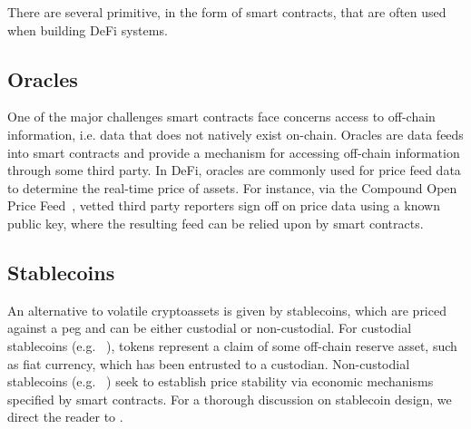 There are several primitive, in the form of smart contracts, that are often used when building DeFi systems.

\subsection{Oracles}
One of the major challenges smart contracts face concerns access to off-chain information, i.e. data that does not natively exist on-chain.
Oracles are data feeds into smart contracts and provide a mechanism for accessing off-chain information through some third party.
In DeFi, oracles are commonly used for price feed data to determine the real-time price of assets.
For instance, via the Compound Open Price Feed~\cite{web:compoundfinance_prices}, vetted third party reporters sign off on price data using a known public key, where the resulting feed can be relied upon by smart contracts.

\subsection{Stablecoins}
An alternative to volatile cryptoassets is given by stablecoins, which are priced against a peg and can be either custodial or non-custodial.
For custodial stablecoins (e.g. ~\cite{web:usdc}), tokens represent a claim of some off-chain reserve asset, such as fiat currency, which has been entrusted to a custodian.
Non-custodial stablecoins (e.g. ~\cite{whitepaper:maker}) seek to establish price stability via economic mechanisms specified by smart contracts.
For a thorough discussion on stablecoin design, we direct the reader to \cite{Klages-Mundt2020}.
